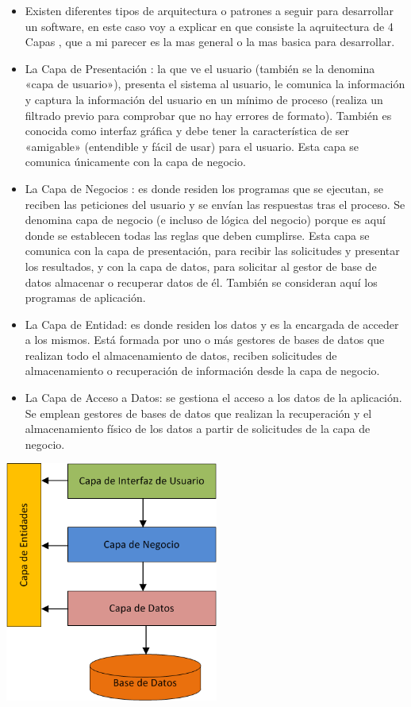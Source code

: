 \documentclass[preprint,12pt]{elsarticle}
\begin{document}
\begin{itemize}
\item Existen diferentes tipos de arquitectura o patrones a seguir para desarrollar un software, en este caso voy a explicar en que consiste la aqruitectura de 4 Capas , que a mi parecer es la mas general o la mas basica para desarrollar.
	\item La Capa de Presentación : la que ve el usuario (también se la denomina «capa de usuario»), presenta el sistema al usuario, le comunica la información y captura la información del usuario en un mínimo de proceso (realiza un filtrado previo para comprobar que no hay errores de formato). También es conocida como interfaz gráfica y debe tener la característica de ser «amigable» (entendible y fácil de usar) para el usuario. Esta capa se comunica únicamente con la capa de negocio.
	\item 	La Capa de Negocios  : es donde residen los programas que se ejecutan, se reciben las peticiones del usuario y se envían las respuestas tras el proceso. Se denomina capa de negocio (e incluso de lógica del negocio) porque es aquí donde se establecen todas las reglas que deben cumplirse. Esta capa se comunica con la capa de presentación, para recibir las solicitudes y presentar los resultados, y con la capa de datos, para solicitar al gestor de base de datos almacenar o recuperar datos de él. También se consideran aquí los programas de aplicación.

	\item 	La Capa de Entidad: es donde residen los datos y es la encargada de acceder a los mismos. Está formada por uno o más gestores de bases de datos que realizan todo el almacenamiento de datos, reciben solicitudes de almacenamiento o recuperación de información desde la capa de negocio.
	
	\item 	La Capa de Acceso a Datos: se gestiona el acceso a los datos de la aplicación. Se emplean gestores de bases de datos que realizan la recuperación y el almacenamiento físico de los datos a partir de solicitudes de la capa de negocio.
	
	\end{itemize}
	\begin{center}
	\includegraphics[width=7cm]{./imagen/23} 
	\end{center}
\end{document}
